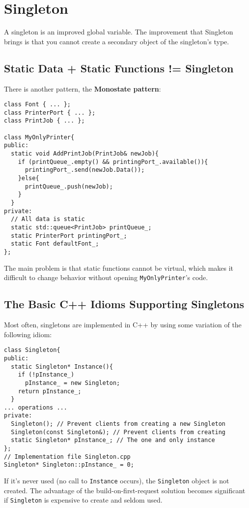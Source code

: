 \newpage
\section{Singleton}

A singleton is an improved global variable. The improvement that
Singleton brings is that you cannot create a secondary object of the
singleton's type.

\subsection{Static Data + Static Functions != Singleton}

There is another pattern, the \textbf{Monostate pattern}:
\begin{verbatim}
class Font { ... };
class PrinterPort { ... };
class PrintJob { ... };

class MyOnlyPrinter{
public:
  static void AddPrintJob(PrintJob& newJob){
    if (printQueue_.empty() && printingPort_.available()){
      printingPort_.send(newJob.Data());
    }else{
      printQueue_.push(newJob);
    }
  }
private:
  // All data is static
  static std::queue<PrintJob> printQueue_;
  static PrinterPort printingPort_;
  static Font defaultFont_;
};
\end{verbatim}

The main problem is that static functions cannot be virtual, which
makes it difficult to change behavior without opening
\texttt{MyOnlyPrinter}'s code.

\subsection{The Basic C++ Idioms Supporting Singletons}

Most often, singletons are implemented in C++ by using some variation
of the following idiom:
\begin{verbatim}
class Singleton{
public:
  static Singleton* Instance(){
    if (!pInstance_)
      pInstance_ = new Singleton;
    return pInstance_;
  }
... operations ...
private:
  Singleton(); // Prevent clients from creating a new Singleton
  Singleton(const Singleton&); // Prevent clients from creating
  static Singleton* pInstance_; // The one and only instance
};
// Implementation file Singleton.cpp
Singleton* Singleton::pInstance_ = 0;
\end{verbatim}

If it's never used (no call to \texttt{Instance} occurs), the
\texttt{Singleton} object is not created. The advantage of the
build-on-first-request solution becomes significant if
\texttt{Singleton} is expensive to create and seldom used. 


